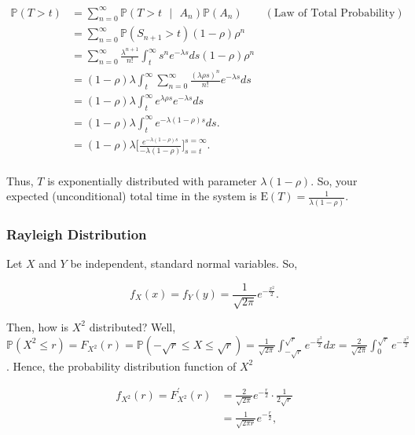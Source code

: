 \documentclass[12pt]{article}
\newcommand{\prob}[1]{\mathbb{P}(#1)}
\newcommand{\condprob}[2]{\mathbb{P}(#1 \text{ } \lvert \text{ } #2)}
\newcommand{\expected}[1]{\text{E}(#1)}
\begin{document}
\begin{align*}
\prob{T > t} &= \sum_{n = 0}^{\infty} \condprob{T > t}{A_n} \prob{A_n} \qquad (\text{Law of Total Probability}) \\
&= \sum_{n = 0}^{\infty} \prob{S_{n+1} > t} (1- \rho) \rho^n \\
&= \sum_{n = 0}^{\infty} \frac{\lambda^{n+1}}{n!} \int_{t}^{\infty} s^n e^{- \lambda s} ds (1- \rho) \rho^n \\
&= (1- \rho) \lambda \int_{t}^{\infty} \sum_{n = 0}^{\infty} \frac{(\lambda \rho s)^{n}}{n!} e^{- \lambda s} ds \\
&= (1- \rho) \lambda \int_{t}^{\infty}  e^{\lambda \rho s} e^{- \lambda s} ds \\
&= (1- \rho) \lambda \int_{t}^{\infty} e^{- \lambda (1-\rho) s} ds. \\
&= (1- \rho) \lambda \Bigg [ \frac{e^{- \lambda (1-\rho) s}}{- \lambda (1 - \rho)} \Bigg ]_{s=t}^{s=\infty}. \\
\end{align*}

\noindent
Thus, $T$ is exponentially distributed with parameter $\lambda (1 - \rho)$. So, your expected (unconditional) total time in the system is $\expected{T} = \frac{1}{\lambda (1 - \rho)}$.

\subsubsection*{Rayleigh Distribution}
Let $X$ and $Y$ be independent, standard normal variables. So, 

\begin{equation*}
f_X(x) = f_Y(y) = \frac{1}{\sqrt{2 \pi}} e^{- \frac{x^2}{2}}. 
\end{equation*}

\noindent
Then, how is $X^2$ distributed? Well, $\prob{X^2 \leq r} = F_{X^2} (r) = \prob{- \sqrt{r} \leq X \leq \sqrt{r}} = \frac{1}{\sqrt{2 \pi}} \int_{- \sqrt{r}}^{\sqrt{r}} e^{- \frac{x^2}{2}} dx = \frac{2}{\sqrt{2 \pi}} \int_{0}^{\sqrt{r}} e^{- \frac{x^2}{2}}$. Hence, the probability distribution function of $X^2$

\begin{align*}
f_{X^2}(r) = F_{X^2}^{'} (r) &= \frac{2}{\sqrt{2 \pi}} e^{- \frac{r}{2}} \cdot \frac{1}{2 \sqrt{r}} \\
&= \frac{1}{\sqrt{2 \pi r}} e^{- \frac{r}{2}}, 
\end{align*}
\end{document}
